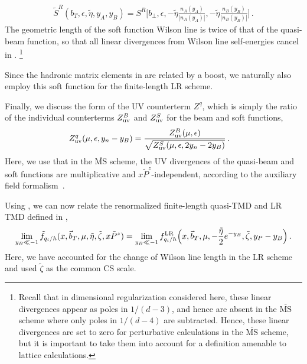 \documentclass[11pt,a4paper]{article}
\newcommand{\MSbar}{{\overline{\mathrm{MS}}}}
\newcommand{\eps}{\epsilon}
\newcommand{\bt}{\vec b_T}
\newcommand{\q}{q_i}
\newcommand{\nA}{n_A}
\newcommand{\nB}{n_B}
\newcommand{\LR}{\mathrm{LR}}
\begin{document}
\begin{align} \label{eq:qsoft_rep}
 \tilde S^R(b_T, \eps, \tilde\eta, y_A, y_B)
 = S^R\bigg[b_\perp, \eps, -\tilde\eta \frac{\nA(y_A)}{|\nA(y_A)|},
      -\tilde\eta \frac{\nB(y_B)}{|\nB(y_B)|} \bigg]
\,.\end{align}
The geometric length of the soft function Wilson line is twice of that of the quasi-beam function, 
so that all linear divergences from Wilson line self-energies cancel in .%
\footnote{
Recall that in dimensional regularization considered here,
these linear divergences appear as poles in $1/(d-3)$,
and hence are absent in the $\MSbar$ scheme where only poles in $1/(d-4)$ are subtracted.
Hence, these linear divergences are set to zero for perturbative calculations in the $\MSbar$ scheme,
but it is important to take them into account for a definition amenable to lattice calculations.}

Since the hadronic matrix elements in  are related
by a boost, we naturally also employ this soft function for the finite-length LR scheme.

Finally, we discuss the form of the UV counterterm $Z^q$,
which is simply the ratio of the individual counterterms $Z_{\rm uv}^B$
and $Z_{\rm uv}^S$ for the beam and soft functions,
\begin{align}
 Z_{\rm uv}^q(\mu, \eps, y_n - y_B) &
 = \frac{Z_{\rm uv}^B(\mu, \eps)}{\sqrt{Z_{\rm uv}^S(\mu, \eps, 2y_n - 2y_B)}}
\,.\end{align}
Here, we use that in the $\MSbar$ scheme, the UV divergences of the quasi-beam
and soft functions are multiplicative and $x\tilde P^z$-independent, 
according to the auxiliary field formalism~\cite{Green:2020xco,Ebert:2020gxr}.

Using , we can now relate the renormalized
finite-length quasi-TMD and LR TMD defined in ,
\begin{align} \label{eq:relation_qTMD_LR}
 \lim_{y_B \ll -1} \tilde f_{\q/h}(x, \bt, \mu, \tilde\eta, \tilde\zeta, x \tilde P^z)
= \lim_{y_B \ll -1} f^\LR_{\q/h}\Bigl(x, \bt, \mu, -\frac{\tilde\eta}{2} e^{-y_B} , \tilde \zeta, y_P - y_B \Bigr)
\,.\end{align}
Here, we have accounted for the change of Wilson line length in the LR scheme and used $\tilde \zeta$ as the common CS scale.
\end{document}
